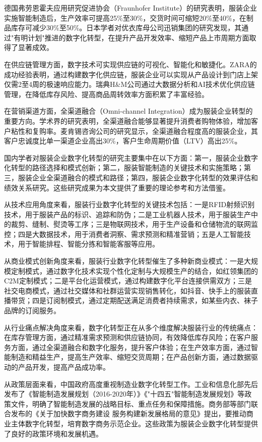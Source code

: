 \documentclass[12pt,a4paper]{article}
\begin{document}
德国弗劳恩霍夫应用研究促进协会（Fraunhofer Institute）的研究表明，服装企业实施智能制造后，生产效率可提高25\%至30\%，交货时间可缩短20\%至40\%，在制品库存可减少30\%至50\%。日本学者对优衣库母公司迅销集团的研究发现，其通过"有明计划"推进的数字化转型，在提升产品开发效率、缩短产品上市周期方面取得了显著成效。

在供应链管理方面，数字技术可实现供应链的可视化、智能化和敏捷化。ZARA的成功经验表明，通过构建数字化供应链，服装企业可以实现从产品设计到门店上架仅需2至4周的极速响应能力。瑞典H\&M公司通过大数据分析和AI技术优化供应链管理，在降低库存风险、提高商品周转效率方面积累了丰富经验。

在营销渠道方面，全渠道融合（Omni-channel Integration）成为服装企业转型的重要方向。学术界的研究表明，全渠道融合能够显著提升消费者购物体验，增加客户粘性和复购率。麦肯锡咨询公司的研究显示，全渠道融合程度高的服装企业，其客户忠诚度比单一渠道企业高出30\%，客户生命周期价值（LTV）高出25\%。

国内学者对服装企业数字化转型的研究主要集中在以下方面：第一，服装企业数字化转型的路径选择和模式创新；第二，服装智能制造的关键技术和实施策略；第三，服装企业全渠道融合的模式和路径；第四，服装企业数字化转型的效果评估和绩效关系研究。这些研究成果为本文提供了重要的理论参考和方法借鉴。

从技术应用角度来看，服装行业数字化转型的关键技术包括：一是RFID射频识别技术，用于服装产品的标识、追踪和防伪；二是工业机器人技术，用于服装生产中的裁剪、缝制、熨烫等工序；三是物联网技术，用于生产设备和仓储物流的联网监控；四是大数据技术，用于消费者洞察、需求预测和精准营销；五是人工智能技术，用于智能排程、智能分拣和智能客服等应用。

从商业模式创新角度来看，服装行业数字化转型催生了多种新商业模式：一是大规模定制模式，通过数字化技术实现个性化定制与大规模生产的结合，如红领集团的C2M定制模式；二是平台化运营模式，通过构建数字化平台连接供需双方；三是社交电商模式，通过社交媒体和社群运营实现销售转化，如抖音、快手上的服装直播带货；四是订阅制模式，通过定期配送满足消费者持续需求，如某些内衣、袜子品牌的订阅服务。

从行业痛点解决角度来看，数字化转型正在从多个维度解决服装行业的传统痛点：在库存管理方面，通过精准需求预测和供应链协同，有效降低库存风险；在客户服务方面，通过全渠道融合和数字化服务，提升客户体验；在生产效率方面，通过智能制造和精益生产，提高生产效率、缩短交货周期；在产品创新方面，通过数据驱动的产品开发，提高产品成功率。

从政策层面来看，中国政府高度重视制造业数字化转型工作。工业和信息化部先后发布了《智能制造发展规划（2016-2020年）》《"十四五"智能制造发展规划》等政策文件，明确了智能制造发展的战略目标、重点任务和保障措施。商务部等部门联合发布的《关于加快数字商务建设 服务构建新发展格局的意见》提出，要推动商业主体数字化转型，培育数字商务示范企业。这些政策为服装企业数字化转型提供了良好的政策环境和发展机遇。
\end{document}
